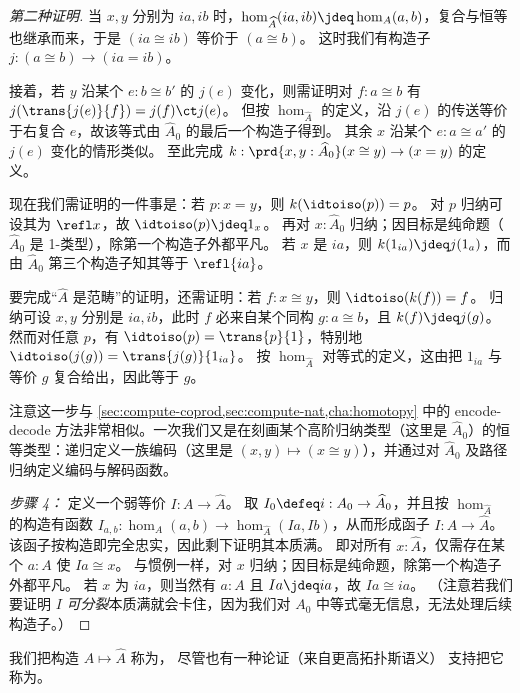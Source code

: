 \begin{proof}[第二种证明]
  当 $x,y$ 分别为 $ia,ib$ 时，$\hom_{\widehat A}(ia,ib)\jdeq \hom_A(a,b)$，复合与恒等也继承而来，于是 $(ia\cong ib)$ 等价于 $(a\cong b)$。
  这时我们有构造子 $j:(a\cong b) \to (ia=ib)$。

  接着，若 $y$ 沿某个 $e:b\cong b'$ 的 $j(e)$ 变化，则需证明对 $f:a\cong b$ 有 $j(\trans{j(e)}{f}) = j(f) \ct j(e)$。
  但按 $\hom_{\widehat A}$ 的定义，沿 $j(e)$ 的传送等价于右复合 $e$，故该等式由 $\widehat A_0$ 的最后一个构造子得到。
  其余 $x$ 沿某个 $e:a\cong a'$ 的 $j(e)$ 变化的情形类似。
  至此完成 $k:\prd{x,y:\widehat A_0} (x\cong y) \to (x=y)$ 的定义。

  现在我们需证明的一件事是：若 $p:x=y$，则 $k(\idtoiso(p))=p$。
  对 $p$ 归纳可设其为 $\refl x$，故 $\idtoiso(p)\jdeq 1_x$。
  再对 $x:\widehat A_0$ 归纳；因目标是纯命题（$\widehat A_0$ 是 1-类型），除第一个构造子外都平凡。
  若 $x$ 是 $ia$，则 $k(1_{ia}) \jdeq j(1_a)$，而由 $\widehat A_0$ 第三个构造子知其等于 $\refl{ia}$。

  要完成“$\widehat A$ 是范畴”的证明，还需证明：若 $f:x\cong y$，则 $\idtoiso(k(f))=f$。
  归纳可设 $x,y$ 分别是 $ia,ib$，此时 $f$ 必来自某个同构 $g:a\cong b$，且 $k(f)\jdeq j(g)$。
  然而对任意 $p$，有 $\idtoiso(p) = \trans{p}{1}$，特别地 $\idtoiso (j(g)) = \trans{j(g)}{1_{ia}}$。
  按 $\hom_{\widehat A}$ 对等式的定义，这由把 $1_{ia}$ 与等价 $g$ 复合给出，因此等于 $g$。

  注意这一步与 \cref{sec:compute-coprod,sec:compute-nat,cha:homotopy} 中的 encode-decode 方法非常相似。一次我们又是在刻画某个高阶归纳类型（这里是 $\widehat A_0$）的恒等类型：递归定义一族编码（这里是 $(x,y)\mapsto (x\cong y)$），并通过对 $\widehat A_0$ 及路径归纳定义编码与解码函数。

  \mentalpause

  \emph{步骤 4：} 定义一个弱等价 $I:A \to \widehat A$。
  取 $I_0 \defeq i : A_0 \to \widehat A_0$，并且按 $\hom_{\widehat A}$ 的构造有函数 $I_{a,b}:\hom_A(a,b) \to \hom_{\widehat A}(Ia,Ib)$，从而形成函子 $I:A \to \widehat A$。
  该函子按构造即完全忠实，因此剩下证明其本质满。
  即对所有 $x:\widehat A$，仅需存在某个 $a:A$ 使 $Ia\cong x$。
  与惯例一样，对 $x$ 归纳；因目标是纯命题，除第一个构造子外都平凡。
  若 $x$ 为 $ia$，则当然有 $a:A$ 且 $Ia\jdeq ia$，故 $Ia \cong ia$。
  （注意若我们要证明 $I$ \emph{可分裂}本质满就会卡住，因为我们对 $A_0$ 中等式毫无信息，无法处理后续构造子。）
\end{proof}

我们把构造 $A\mapsto \widehat A$ 称为，
尽管也有一种论证（来自更高拓扑斯语义）
%
支持把它称为。
%
%

